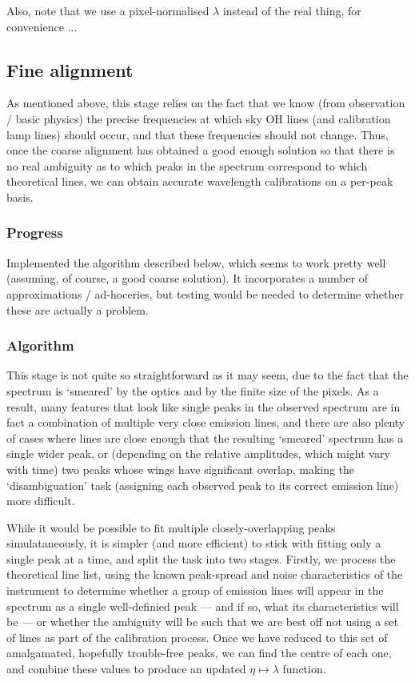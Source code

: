 Also, note that we use a pixel-normalised $\lambda$ instead of the real thing, for
convenience ...


\subsection{Fine alignment}

As mentioned above, this stage relies on the fact that we know (from
observation / basic physics) the precise frequencies at which sky OH lines
(and calibration lamp lines) should occur, and that these frequencies should
not change. Thus, once the coarse alignment has obtained a good enough solution
so that there is no real ambiguity as to which peaks in the spectrum correspond
to which theoretical lines, we can obtain accurate wavelength calibrations on a
per-peak basis.

\subsubsection{Progress}

Implemented the algorithm described below, which seems to work pretty well
(assuming, of course, a good coarse solution). It incorporates a number of
approximations / ad-hoceries, but testing would be needed to determine whether
these are actually a problem.

\subsubsection{Algorithm}

This stage is not quite so straightforward as it may seem, due to the
fact that the spectrum is `smeared' by the optics and by the finite size
of the pixels. As a result, many features that look like single peaks in
the observed spectrum are in fact a combination of multiple very close
emission lines, and there are also plenty of cases where lines are close
enough that the resulting `smeared' spectrum has a single wider peak, or
(depending on the relative amplitudes, which might vary with time) two
peaks whose wings have significant overlap, making the `disambiguation'
task (assigning each observed peak to its correct emission line) more
difficult.

While it would be possible to fit multiple closely-overlapping peaks
simulataneously, it is simpler (and more efficient) to stick with
fitting only a single peak at a time, and split the task into two
stages. Firstly, we process the theoretical line list, using the known
peak-spread and noise characteristics of the instrument to determine
whether a group of emission lines will appear in the spectrum as a
single well-definied peak --- and if so, what its characteristics will
be --- or whether the ambiguity will be such that we are best off not
using a set of lines as part of the calibration process. Once we have
reduced to this set of amalgamated, hopefully trouble-free peaks, we
can find the centre of each one, and combine these values to produce an
updated $\eta \mapsto \lambda$ function.

